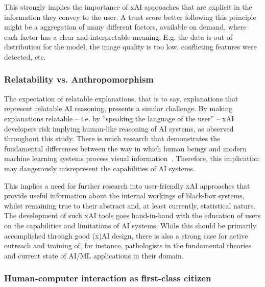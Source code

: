 This strongly implies the importance of xAI approaches that are explicit in the information they convey to the user. A trust score better following this principle might be a aggregation of many different factors, available on demand, where each factor has a clear and interpretable meaning: E.g. the data is out of distribution for the model, the image quality is too low, conflicting features were detected, etc.

\subsubsection{Relatability vs. Anthropomorphism}

The expectation of relatable explanations, that is to say, explanations that represent relatable AI reasoning, presents a similar challenge. By making explanations relatable -- i.e. by ``speaking the language of the user'' -- xAI developers risk implying human-like reasoning of AI systems, as observed throughout this study. There is much research that demonstrates the fundamental differences between the way in which human beings and modern machine learning systems process visual information~\cite{geirhos2020shortcut}. Therefore, this implication may dangerously misrepresent the capabilities of AI systems.

This implies a need for further research into user-friendly xAI approaches that provide useful information about the internal workings of black-box systems, whilst remaining true to their abstract and, at least currently, statistical nature. The development of such xAI tools goes hand-in-hand with the education of users on the capabilities and limitations of AI systems. While this should be primarily accomplished through good (x)AI design, there is also a strong case for active outreach and training of, for instance, pathologists in the fundamental theories and current state of AI/ML applications in their domain.



\subsubsection{Human-computer interaction as first-class citizen}

